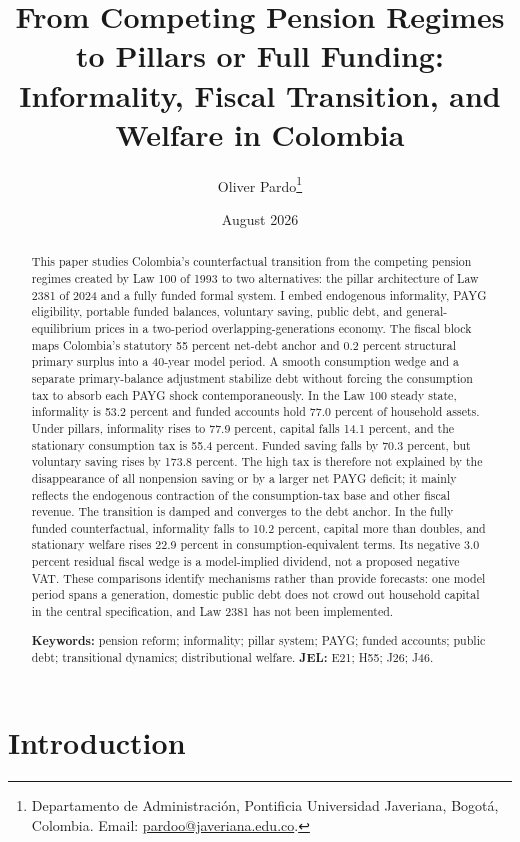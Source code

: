 \documentclass[12pt]{article}
\title{\textbf{From Competing Pension Regimes to Pillars or Full Funding:}\\
\large Informality, Fiscal Transition, and Welfare in Colombia}
\author{Oliver Pardo\thanks{Departamento de Administraci{\'o}n, Pontificia Universidad Javeriana,
Bogot{\'a}, Colombia. Email: \href{mailto:pardoo@javeriana.edu.co}{pardoo@javeriana.edu.co}.}}
\date{August 2026}
\newcommand{\1}{\mathbf{1}}
\begin{document}
\maketitle

\begin{abstract}\small\sloppy
\noindent
This paper studies Colombia's counterfactual transition from the competing pension regimes
created by Law 100 of 1993 to two alternatives: the pillar architecture of Law 2381 of 2024
and a fully funded formal system. I embed endogenous informality, PAYG eligibility, portable
funded balances, voluntary saving, public debt, and general-equilibrium prices in a two-period
overlapping-generations economy. The fiscal block maps Colombia's statutory 55 percent
net-debt anchor and 0.2 percent structural primary surplus into a 40-year model period. A
smooth consumption wedge and a separate primary-balance adjustment stabilize debt without
forcing the consumption tax to absorb each PAYG shock contemporaneously. In the Law 100
steady state, informality is 53.2 percent and funded accounts hold 77.0 percent of household
assets. Under pillars, informality rises to 77.9 percent, capital falls 14.1 percent, and the
stationary consumption tax is 55.4 percent. Funded saving falls by 70.3 percent, but voluntary
saving rises by 173.8 percent. The high tax is therefore not explained by the disappearance of
all nonpension saving or by a larger net PAYG deficit; it mainly reflects the endogenous
contraction of the consumption-tax base and other fiscal revenue. The transition is damped
and converges to the debt anchor. In the fully funded counterfactual, informality falls to
10.2 percent, capital more than doubles, and stationary welfare rises 22.9 percent in
consumption-equivalent terms. Its negative 3.0 percent residual fiscal wedge is a model-implied
dividend, not a proposed negative VAT. These comparisons identify mechanisms rather than
provide forecasts: one model period spans a generation, domestic public debt does not crowd
out household capital in the central specification, and Law 2381 has not been implemented.

\medskip\noindent\textbf{Keywords:} pension reform; informality; pillar system; PAYG; funded accounts;
public debt; transitional dynamics; distributional welfare. \quad \textbf{JEL:} E21; H55; J26; J46.
\end{abstract}\fussy

\section{Introduction}
\end{document}
